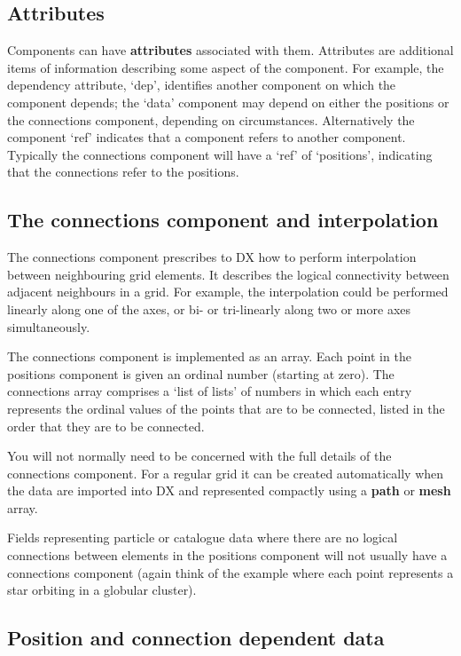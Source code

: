 \documentclass[twoside,11pt]{article}
\begin{document}
\subsection{Attributes}

Components can have {\bf attributes} associated with them. Attributes
are additional items of information describing some aspect of the
component. For example, the dependency attribute, `dep', identifies
another component on which the component depends; the `data' component
may depend on either the positions or the connections component, depending
on circumstances. Alternatively the component `ref' indicates that a
component refers to another component. Typically the connections
component will have a `ref' of `positions', indicating that the
connections refer to the positions.

\subsection{\label{CONINT}The connections component and interpolation}


The connections component prescribes to DX how to perform interpolation
between neighbouring grid elements. It describes the logical
connectivity between adjacent neighbours in a grid. For example, the
interpolation could be performed linearly along one of the axes, or
bi- or tri-linearly along two or more axes simultaneously.

The connections component is implemented as an array. Each point in the
positions component is given an ordinal number (starting at zero). The
connections array comprises a `list of lists' of numbers in which each
entry represents the ordinal values of the points that are to be
connected, listed in the order that they are to be connected.

You will not normally need to be concerned with the full details of the
connections component. For a regular grid it can be created
automatically when the data are imported into DX and represented
compactly using a {\bf path} or {\bf mesh} array.

Fields representing particle or catalogue data where there are no
logical connections between elements in the positions component will
not usually have a connections component (again think of the example
where each point represents a star orbiting in a globular cluster).

\subsection{\label{POSCONDEP}Position and connection dependent data}
\end{document}
